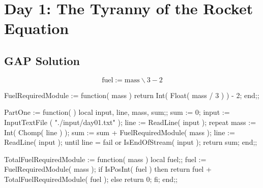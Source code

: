 \newpage%
\chapter{Day 1: The Tyranny of the Rocket Equation}
\nwenddocs{}\section{GAP Solution}

\begin{marginfigure}
\[
 \text{fuel} := \text{mass} \backslash 3 - 2
\]
\end{marginfigure}
\nwenddocs{}\endmoddef\nwstartdeflinemarkup{}\nwenddeflinemarkup
FuelRequiredModule := function( mass )
    return Int( Float( mass / 3 ) ) - 2;
end;;


\nwendcode{}\nwdocspar

\nwenddocs{}\plusendmoddef\nwstartdeflinemarkup{}\nwenddeflinemarkup
PartOne := function( )
    local input, line, mass, sum;;
    sum := 0;
    input := InputTextFile ( "./input/day01.txt" );
    line := ReadLine( input );
    repeat
        mass := Int( Chomp( line ) );
        sum := sum + FuelRequiredModule( mass );
        line := ReadLine( input );
    until line = fail or IsEndOfStream( input );
    return sum;
end;;


\nwendcode{}\nwdocspar

\nwenddocs{}\plusendmoddef\nwstartdeflinemarkup{}\nwenddeflinemarkup
TotalFuelRequiredModule := function( mass )
    local fuel;;
    fuel := FuelRequiredModule( mass );
    if IsPosInt( fuel ) then
        return fuel + TotalFuelRequiredModule( fuel );
    else
        return 0;
    fi;
end;;


